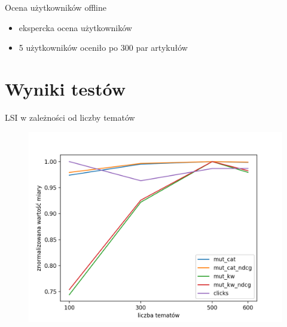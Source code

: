 \documentclass{beamer}
\begin{document}
	\begin{frame}{Ocena użytkowników offline}
		\begin{itemize}
			\item ekspercka ocena użytkowników
			\item 5 użytkowników oceniło po 300 par artykułów
		\end{itemize}
	\end{frame}
	\section{Wyniki testów}
	\begin{frame}{LSI w zależności od liczby tematów}
		\begin{figure}[H]
			\centering
			\includegraphics[width=1\textwidth]{img/results/lsi_.png}
		\end{figure}
	\end{frame}
\end{document}

